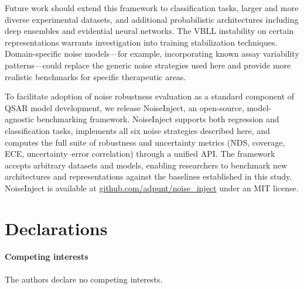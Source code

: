 \documentclass[pdflatex,sn-mathphys-num]{sn-jnl}%
\theoremstyle{thmstyleone}%
\theoremstyle{thmstyletwo}%
\theoremstyle{thmstylethree}%
\begin{document}
Future work should extend this framework to classification tasks, larger and more diverse experimental datasets, and additional probabilistic architectures including deep ensembles and evidential neural networks. The VBLL instability on certain representations warrants investigation into training stabilization techniques. Domain-specific noise models---for example, incorporating known assay variability patterns---could replace the generic noise strategies used here and provide more realistic benchmarks for specific therapeutic areas.

To facilitate adoption of noise robustness evaluation as a standard component of QSAR model development, we release NoiseInject, an open-source, model-agnostic benchmarking framework. NoiseInject supports both regression and classification tasks, implements all six noise strategies described here, and computes the full suite of robustness and uncertainty metrics (NDS, coverage, ECE, uncertainty--error correlation) through a unified API. The framework accepts arbitrary datasets and models, enabling researchers to benchmark new architectures and representations against the baselines established in this study. NoiseInject is available at \url{github.com/adpunt/noise\_inject} under an MIT license.

\section*{Declarations}

\paragraph{Competing interests}
The authors declare no competing interests.


\end{document}
